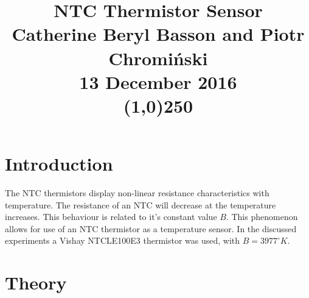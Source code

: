 \documentclass[a4,11pt]{article}
\begin{document}
\twocolumn
\title{\Huge{NTC Thermistor Sensor}\\
	\Large{Catherine Beryl Basson and Piotr Chromi\'nski}\\
	\large{13 December 2016}\\
	\line(1,0){250}}
\date{}
\maketitle
\section{Introduction}

The NTC thermistors display non-linear resistance characteristics with temperature. The resistance of an NTC will decrease at the temperature increases. This behaviour is related to it's constant value $B$. This phenomenon allows for use of an NTC thermistor as a temperature sensor. In the discussed experiments a Vishay NTCLE100E3 thermistor was used, with $B=3977^{\circ}K$.

\section{Theory}
\end{document}
